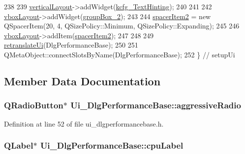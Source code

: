 \begin{DoxyCode}
238 
239         \hyperlink{classUi__DlgPerformanceBase_a76a6b51ca5ca1453077c22f2622a33cf}{verticalLayout}->addWidget(\hyperlink{classUi__DlgPerformanceBase_a74b774561fae047471009b814b7e7f86}{kcfg\_TextHinting});
240 
241 
242         \hyperlink{classUi__DlgPerformanceBase_abae379ebe3e2f77707d6621ce00a7236}{vboxLayout}->addWidget(\hyperlink{classUi__DlgPerformanceBase_a9c18db71e6b225bedfe650309a347b59}{groupBox\_2});
243 
244         \hyperlink{classUi__DlgPerformanceBase_a0bd18580deb85e001791945f5bfdca5b}{spacerItem2} = \textcolor{keyword}{new} QSpacerItem(20, 4, QSizePolicy::Minimum, QSizePolicy::Expanding);
245 
246         \hyperlink{classUi__DlgPerformanceBase_abae379ebe3e2f77707d6621ce00a7236}{vboxLayout}->addItem(\hyperlink{classUi__DlgPerformanceBase_a0bd18580deb85e001791945f5bfdca5b}{spacerItem2});
247 
248 
249         \hyperlink{classUi__DlgPerformanceBase_af4afa7d4d099f4b8448d8ceb5b3b6282}{retranslateUi}(DlgPerformanceBase);
250 
251         QMetaObject::connectSlotsByName(DlgPerformanceBase);
252     \} \textcolor{comment}{// setupUi}
\end{DoxyCode}


\subsection{Member Data Documentation}
\hypertarget{classUi__DlgPerformanceBase_a87fd4332c8e17d282219978817ae8e4f}{
\subsubsection[{aggressive\+Radio}]{\setlength{\rightskip}{0pt plus 5cm}Q\+Radio\+Button$\ast$ Ui\+\_\+\+Dlg\+Performance\+Base\+::aggressive\+Radio}}\label{classUi__DlgPerformanceBase_a87fd4332c8e17d282219978817ae8e4f}


Definition at line 52 of file ui\+\_\+dlgperformancebase.\+h.

\hypertarget{classUi__DlgPerformanceBase_add0831b3efdd1175e047cbffe44f0f8d}{
\subsubsection[{cpu\+Label}]{\setlength{\rightskip}{0pt plus 5cm}Q\+Label$\ast$ Ui\+\_\+\+Dlg\+Performance\+Base\+::cpu\+Label}}\label{classUi__DlgPerformanceBase_add0831b3efdd1175e047cbffe44f0f8d}


